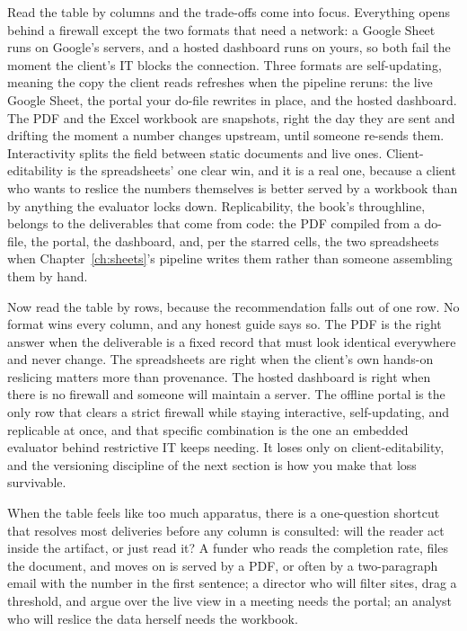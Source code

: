 \documentclass[
    a4paper,
    fontsize=10pt,
    twoside=true,
    numbers=noenddot,
]{kaobook}
\begin{document}
Read the table by columns and the trade-offs come into focus. Everything opens behind a firewall except the two formats that need a network: a Google Sheet runs on Google's servers, and a hosted dashboard runs on yours, so both fail the moment the client's IT blocks the connection. Three formats are self-updating, meaning the copy the client reads refreshes when the pipeline reruns: the live Google Sheet, the portal your do-file rewrites in place, and the hosted dashboard. The PDF and the Excel workbook are snapshots, right the day they are sent and drifting the moment a number changes upstream, until someone re-sends them. Interactivity splits the field between static documents and live ones. Client-editability is the spreadsheets' one clear win, and it is a real one, because a client who wants to reslice the numbers themselves is better served by a workbook than by anything the evaluator locks down. Replicability, the book's throughline, belongs to the deliverables that come from code: the PDF compiled from a do-file, the portal, the dashboard, and, per the starred cells, the two spreadsheets when Chapter~\ref{ch:sheets}'s pipeline writes them rather than someone assembling them by hand.

Now read the table by rows, because the recommendation falls out of one row. No format wins every column, and any honest guide says so. The PDF is the right answer when the deliverable is a fixed record that must look identical everywhere and never change. The spreadsheets are right when the client's own hands-on reslicing matters more than provenance. The hosted dashboard is right when there is no firewall and someone will maintain a server. The offline portal is the only row that clears a strict firewall while staying interactive, self-updating, and replicable at once, and that specific combination is the one an embedded evaluator behind restrictive IT keeps needing. It loses only on client-editability, and the versioning discipline of the next section is how you make that loss survivable.

When the table feels like too much apparatus, there is a one-question shortcut that resolves most deliveries before any column is consulted: will the reader act inside the artifact, or just read it? A funder who reads the completion rate, files the document, and moves on is served by a PDF, or often by a two-paragraph email with the number in the first sentence; a director who will filter sites, drag a threshold, and argue over the live view in a meeting needs the portal; an analyst who will reslice the data herself needs the workbook.
\end{document}
